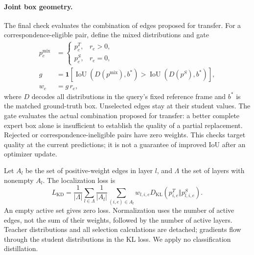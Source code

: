 \paragraph{Joint box geometry.}
The final check evaluates the combination of edges proposed for transfer. For a correspondence-eligible pair, define the mixed distributions and gate
\begin{equation}
\begin{aligned}
p^{\mathrm{mix}}_e&=\begin{cases}
p^T_e,&r_e>0,\\
p^S_e,&r_e=0,
\end{cases}\\
g&=\mathbf{1}\!\left[
\operatorname{IoU}(D(p^{\mathrm{mix}}),b^*)>
\operatorname{IoU}(D(p^S),b^*)\right],\\
w_e&=g\,r_e ,
\end{aligned}
\label{eq:mixed}
\end{equation}
where $D$ decodes all distributions in the query's fixed reference frame and $b^*$ is the matched ground-truth box. Unselected edges stay at their student values. The gate evaluates the actual combination proposed for transfer: a better complete expert box alone is insufficient to establish the quality of a partial replacement. Rejected or correspondence-ineligible pairs have zero weights. This checks target quality at the current predictions; it is not a guarantee of improved IoU after an optimizer update.

Let $A_l$ be the set of positive-weight edges in layer $l$, and $\Lambda$ the set of layers with nonempty $A_l$. The localization loss is
\begin{equation}
L_{\mathrm{KD}}=\frac{1}{|\Lambda|}\sum_{l\in\Lambda}
\frac{1}{|A_l|}\sum_{(i,e)\in A_l}
w_{l,i,e}D_{\mathrm{KL}}\!\left(p^T_{i,e}\Vert p^S_{l,i,e}\right).
\label{eq:kd}
\end{equation}
An empty active set gives zero loss. Normalization uses the number of active edges, not the sum of their weights, followed by the number of active layers. Teacher distributions and all selection calculations are detached; gradients flow through the student distributions in the KL loss. We apply no classification distillation.

